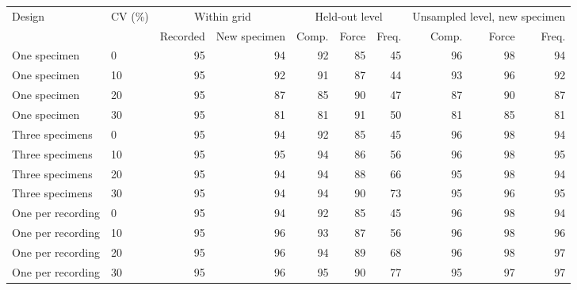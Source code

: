 \begin{tabular}{llrrrrrrrr}
\toprule
Design & CV (\%) & \multicolumn{2}{c}{Within grid} & \multicolumn{3}{c}{Held-out level} & \multicolumn{3}{c}{Unsampled level, new specimen} \\
\cmidrule(lr){3-4}\cmidrule(lr){5-7}\cmidrule(lr){8-10}
 & & Recorded & New specimen & Comp. & Force & Freq. & Comp. & Force & Freq. \\
\midrule
One specimen & 0 & 95 & 94 & 92 & 85 & 45 & 96 & 98 & 94 \\
One specimen & 10 & 95 & 92 & 91 & 87 & 44 & 93 & 96 & 92 \\
One specimen & 20 & 95 & 87 & 85 & 90 & 47 & 87 & 90 & 87 \\
One specimen & 30 & 95 & 81 & 81 & 91 & 50 & 81 & 85 & 81 \\
\midrule
Three specimens & 0 & 95 & 94 & 92 & 85 & 45 & 96 & 98 & 94 \\
Three specimens & 10 & 95 & 95 & 94 & 86 & 56 & 96 & 98 & 95 \\
Three specimens & 20 & 95 & 94 & 94 & 88 & 66 & 95 & 98 & 94 \\
Three specimens & 30 & 95 & 94 & 94 & 90 & 73 & 95 & 96 & 95 \\
\midrule
One per recording & 0 & 95 & 94 & 92 & 85 & 45 & 96 & 98 & 94 \\
One per recording & 10 & 95 & 96 & 93 & 87 & 56 & 96 & 98 & 96 \\
One per recording & 20 & 95 & 96 & 94 & 89 & 68 & 96 & 98 & 97 \\
One per recording & 30 & 95 & 96 & 95 & 90 & 77 & 95 & 97 & 97 \\
\bottomrule
\end{tabular}
